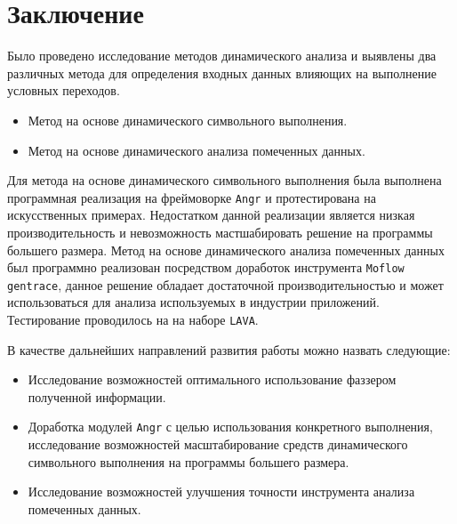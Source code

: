 \bigskip
\chapter*{Заключение}

Было проведено исследование методов динамического анализа и выявлены два различных метода для определения входных данных влияющих на выполнение условных переходов.

\begin{itemize}
    \item Метод на основе динамического символьного выполнения.
    \item Метод на основе динамического анализа помеченных данных.
\end{itemize}

Для метода на основе динамического символьного выполнения была выполнена программная реализация на фреймоворке \texttt{Angr} и протестирована на искусственных примерах. Недостатком данной реализации является низкая производительность и невозможность мастшабировать решение на программы большего размера.
Метод на основе динамического анализа помеченных данных был программно реализован посредством доработок инструмента \texttt{Moflow gentrace}, данное решение обладает достаточной производительностью и может использоваться для анализа используемых в индустрии приложений. Тестирование проводилось на на наборе \texttt{LAVA}.


В качестве дальнейших направлений развития работы можно назвать следующие:

\begin{itemize}
    \item Исследование возможностей оптимального использование фаззером полученной информации.
    \item Доработка модулей \texttt{Angr} с целью использования конкретного выполнения, исследование возможностей масштабирование средств динамического символьного выполнения на программы большего размера.
    \item Исследование возможностей улучшения точности инструмента анализа помеченных данных.
\end{itemize}



